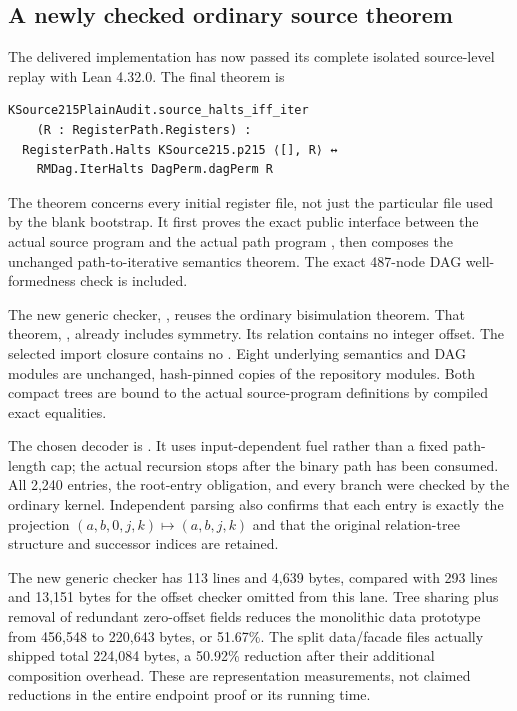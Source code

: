 \subsection{A newly checked ordinary source theorem}

The delivered  implementation has now passed its complete isolated source-level replay with Lean 4.32.0. The final theorem is
\begin{lstlisting}
KSource215PlainAudit.source_halts_iff_iter
    (R : RegisterPath.Registers) :
  RegisterPath.Halts KSource215.p215 ⟨[], R⟩ ↔
    RMDag.IterHalts DagPerm.dagPerm R
\end{lstlisting}
The theorem concerns every initial register file, not just the particular file used by the blank bootstrap. It first proves the exact public  interface between the actual source program and the actual path program , then composes the unchanged path-to-iterative semantics theorem. The exact 487-node DAG well-formedness check is included.

The new generic checker, , reuses the ordinary bisimulation theorem. That theorem, , already includes symmetry. Its relation contains no integer offset. The selected import closure contains no . Eight underlying semantics and DAG modules are unchanged, hash-pinned copies of the repository modules. Both compact trees are bound to the actual source-program definitions by compiled exact equalities.

The chosen decoder is . It uses input-dependent fuel rather than a fixed path-length cap; the actual recursion stops after the binary path has been consumed. All 2,240 entries, the root-entry obligation, and every branch were checked by the ordinary kernel. Independent parsing also confirms that each entry is exactly the projection $(a,b,0,j,k)\mapsto(a,b,j,k)$ and that the original relation-tree structure and successor indices are retained.

The new generic checker has 113 lines and 4,639 bytes, compared with 293 lines and 13,151 bytes for the offset checker omitted from this lane. Tree sharing plus removal of redundant zero-offset fields reduces the monolithic data prototype from 456,548 to 220,643 bytes, or 51.67\%. The split data/facade files actually shipped total 224,084 bytes, a 50.92\% reduction after their additional composition overhead. These are representation measurements, not claimed reductions in the entire endpoint proof or its running time.

